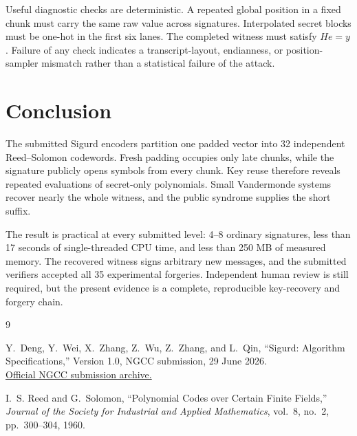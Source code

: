 \documentclass[11pt,a4paper]{article}
\begin{document}
Useful diagnostic checks are deterministic.  A repeated global position in a
fixed chunk must carry the same raw value across signatures.  Interpolated
secret blocks must be one-hot in the first six lanes.  The completed witness
must satisfy $He=y$.  Failure of any check indicates a transcript-layout,
endianness, or position-sampler mismatch rather than a statistical failure of
the attack.

\section{Conclusion}

The submitted Sigurd encoders partition one padded vector into 32 independent
Reed--Solomon codewords.  Fresh padding occupies only late chunks, while the
signature publicly opens symbols from every chunk.  Key reuse therefore
reveals repeated evaluations of secret-only polynomials.  Small Vandermonde
systems recover nearly the whole witness, and the public syndrome supplies the
short suffix.

The result is practical at every submitted level: 4--8 ordinary signatures,
less than 17 seconds of single-threaded CPU time, and less than 250 MB of
measured memory.  The recovered witness signs arbitrary new messages, and the
submitted verifiers accepted all 35 experimental forgeries.  Independent human
review is still required, but the present evidence is a complete,
reproducible key-recovery and forgery chain.

\begin{thebibliography}{9}

Y.~Deng, Y.~Wei, X.~Zhang, Z.~Wu, Z.~Zhang, and L.~Qin,
``Sigurd: Algorithm Specifications,'' Version 1.0, NGCC submission,
29 June 2026.\\
\href{https://www.niccs.org.cn/niccs/Proposal/Public-Key\%20Cryptographic\%20Algorithms/Round\%201\%20candidates/Sigurd.zip}{Official NGCC submission archive.}

I.~S. Reed and G.~Solomon,
``Polynomial Codes over Certain Finite Fields,''
\emph{Journal of the Society for Industrial and Applied Mathematics},
vol.~8, no.~2, pp.~300--304, 1960.

\end{thebibliography}
\end{document}
